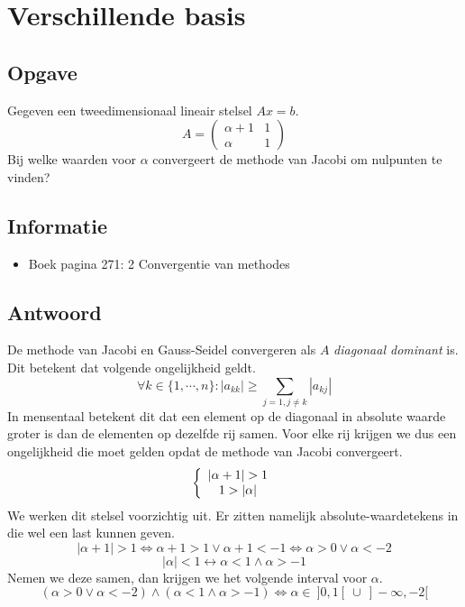 \documentclass[examenvragen.tex]{subfiles}
\begin{document}
\section{Verschillende basis}
\subsection{Opgave}
Gegeven een tweedimensionaal lineair stelsel $Ax=b$.
\[
A = \begin{pmatrix}
\alpha + 1 & 1 \\
\alpha &1
\end{pmatrix}
\]
Bij welke waarden voor $\alpha$ convergeert de methode van Jacobi om nulpunten te vinden?
\subsection{Informatie}
\begin{itemize}
\item Boek pagina 271: 2 Convergentie van methodes
\end{itemize}
\subsection{Antwoord}
De methode van Jacobi en Gauss-Seidel convergeren als $A$ \emph{diagonaal dominant} is. Dit betekent dat volgende ongelijkheid geldt.
\[
\forall k \in \{1,\cdots,n\}: |a_{kk}| \ge \sum_{j=1,j\neq k}|a_{kj}|
\]
In mensentaal betekent dit dat een element op de diagonaal in absolute waarde groter is dan de elementen op dezelfde rij samen.
Voor elke rij krijgen we dus een ongelijkheid die moet gelden opdat de methode van Jacobi convergeert.
\[
\left\{
\begin{array}{c c}
|\alpha +1| > 1\\
1 > |\alpha|
\end{array}
\right.
\]
We werken dit stelsel voorzichtig uit. Er zitten namelijk absolute-waardetekens in die wel een last kunnen geven.
\[
|\alpha+1|>1 \Leftrightarrow \alpha + 1 > 1 \vee \alpha + 1 < -1 \Leftrightarrow \alpha > 0 \vee \alpha < -2
\]
\[
|\alpha|<1 \leftrightarrow \alpha < 1 \wedge \alpha > -1
\]
Nemen we deze samen, dan krijgen we het volgende interval voor $\alpha$.
\[
(\alpha > 0 \vee \alpha < -2) \wedge (\alpha < 1 \wedge \alpha > -1) \Leftrightarrow \alpha \in\ ]0,1[\ \cup\ ]-\infty,-2[
\]
\end{document}
